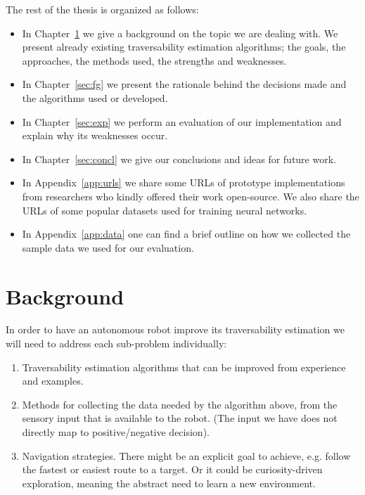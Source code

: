 \documentclass[12pt,a4paper,table,dvipsnames,tikz]{report}
\newcommand{\acronym}{\MakeUppercase}
\begin{document}
	The rest of the thesis is organized as follows:
	\begin{itemize}
		\item In Chapter~\ref{sec:bg} we give a background on the topic we are dealing 
		with. We present already existing traversability estimation algorithms; the 
		goals, the approaches, the methods used, the strengths and weaknesses. 
		\item In Chapter~\ref{sec:fg} we present the rationale behind the decisions made 
		and the algorithms used or developed.
		\item In Chapter~\ref{sec:exp} we perform an evaluation of our implementation 
		and explain why its weaknesses occur.
		\item In Chapter~\ref{sec:concl} we give our conclusions and ideas for future 
		work.
		\item In Appendix~\ref{app:urls} we share some \acronym{url}s of prototype 
		implementations from researchers who kindly offered their work open-source. 
		We also share the \acronym{url}s of some popular datasets used for training
		neural networks.
		\item In Appendix~\ref{app:data} one can find a brief outline on how 
		we collected the sample data we used for our evaluation.
	\end{itemize}
	
	\chapter{Background}
	\label{sec:bg}
	
	In order to have an autonomous robot improve its traversability 
	estimation we will need to address each sub-problem individually:
	
	\begin{enumerate}
		\item Traversability estimation algorithms that can be improved from 
		experience and examples.
		\item Methods for collecting the data needed by the algorithm above, from 
		the sensory input that is available to the robot. (The input we have does not 
		directly map to positive/negative decision).
		\item Navigation strategies. There might be an explicit goal to achieve, e.g.
		follow the fastest or easiest route to a target. Or it could be curiosity-driven 
		exploration, meaning the abstract need to learn a new environment.
	\end{enumerate}
	
\end{document}
